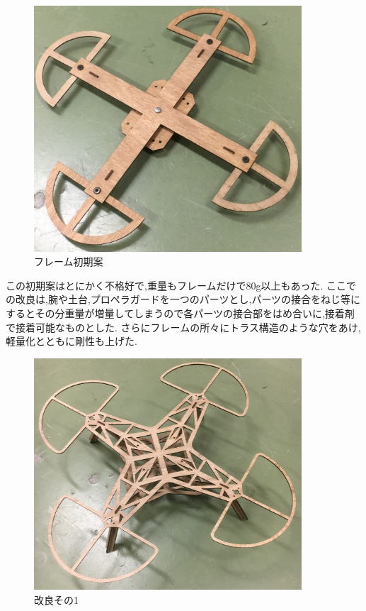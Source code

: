 \documentclass[12pt,oneside]{paper}
\begin{document}
\begin{figure}[H]
  \begin{center}
    \includegraphics[width=100mm]{ga/ori.jpg}
    \end{center}
  \caption{フレーム初期案}
 \label{fig:ori}
\end{figure}

この初期案はとにかく不格好で,重量もフレームだけで80g以上もあった.
ここでの改良は,腕や土台,プロペラガードを一つのパーツとし,パーツの接合をねじ等にするとその分重量が増量してしまうので各パーツの接合部をはめ合いに,接着剤で接着可能なものとした.
さらにフレームの所々にトラス構造のような穴をあけ,軽量化とともに剛性も上げた.

\begin{figure}[H]
  \begin{center}
    \includegraphics[width=100mm]{ga/sec.jpg}
    \end{center}
  \caption{改良その1}
 \label{fig:sec}
\end{figure}
\end{document}

